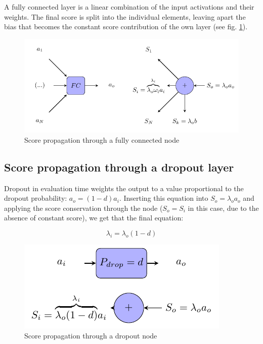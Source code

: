 A fully connected layer is a linear combination of the input activations and their weights. The final score is split into the individual elements, leaving apart the bias that becomes the constant score contribution of the own layer (see fig. \ref{score:fig:score_fc}).

\begin{figure}[!ht]
	\centering
	\includegraphics{Figures/chapter_interpretation/figures/score_fc.pdf}
	\caption{Score propagation through a fully connected node}
	\label{score:fig:score_fc}
\end{figure}

\subsection{Score propagation through a dropout layer}

Dropout in evaluation time weights the output to a value proportional to the dropout probability: $a_o = (1-d)a_i$. Inserting this equation into $S_o = \lambda_o a_o$ and applying the score conservation through the node ($S_o = S_i$ in this case, due to the absence of constant score), we get that the final equation:

\begin{equation}
\lambda_i = \lambda_o (1-d)
\end{equation}

\begin{figure}[!ht]
	\centering
	\includegraphics{Figures/chapter_interpretation/figures/score_dropout.pdf}
	\caption{Score propagation through a dropout node}
	\label{score:fig:score_dropout}
\end{figure}

